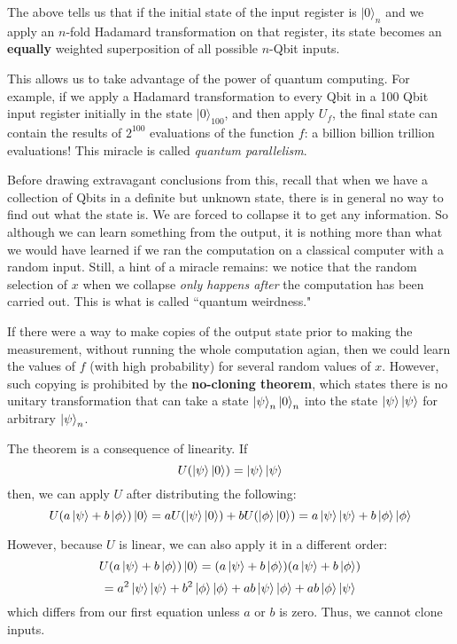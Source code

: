\documentclass[letterpaper]{article}
\begin{document}
The above tells us that if the initial state of the input register is $\vert 0 \rangle_{n}$ and we apply an $n$-fold Hadamard transformation on that register, its state becomes an \textbf{equally} weighted superposition of all possible $n$-Qbit inputs. 

This allows us to take advantage of the power of quantum computing. For example, if we apply a Hadamard transformation to every Qbit in a 100 Qbit input register initially in the state $\vert 0 \rangle_{100}$, and then apply $U_{f}$, the final state can contain the results of $2^{100}$ evaluations of the function $f$: a billion billion trillion evaluations! This miracle is called \textsl{quantum parallelism}. 

Before drawing extravagant conclusions from this, recall that when we have a collection of Qbits in a definite but unknown state, there is in general no way to find out what the state is. We are forced to collapse it to get any information. So although we can learn something from the output, it is nothing more than what we would have learned if we ran the computation on a classical computer with a random input. Still, a hint of a miracle remains: we notice that the random selection of $x$ when we collapse \textsl{only happens after} the computation has been carried out. This is what is called ``quantum weirdness."  

If there were a way to make copies of the output state prior to making the measurement, without running the whole computation agian, then we could learn the values of $f$ (with high probability) for several random values of $x$. However, such copying is prohibited by the \textbf{no-cloning theorem}, which states there is no unitary transformation that can take a state $\ket{\psi}_{n} \ket{0}_{n}$ into the state $\ket{\psi} \ket{\psi}$ for arbitrary $\ket{\psi}_{n}$. 

The theorem is a consequence of linearity. If 
$$ U(\ket{\psi} \ket{0}) = \ket{\psi} \ket{\psi} $$ 
then, we can apply $U$ after distributing the following: 
$$ U(a \ket{\psi} + b \ket{\phi})\ket{0} = aU(\ket{\psi}\ket{0}) + bU(\ket{\phi}\ket{0}) = a\ket{\psi}\ket{\psi} + b\ket{\phi}\ket{\phi} $$

However, because $U$ is linear, we can also apply it in a different order: 
$$ U(a \ket{\psi} + b \ket{\phi})\ket{0} = (a\ket{\psi} + b\ket{\phi})(a\ket{\psi} + b\ket{\phi})$$ 
$$ = a^{2}\ket{\psi}\ket{\psi} + b^{2}\ket{\phi}\ket{\phi} + ab\ket{\psi}\ket{\phi} + ab\ket{\phi}\ket{\psi}$$
which differs from our first equation unless $a$ or $b$ is zero. Thus, we cannot clone inputs. 
\end{document}
